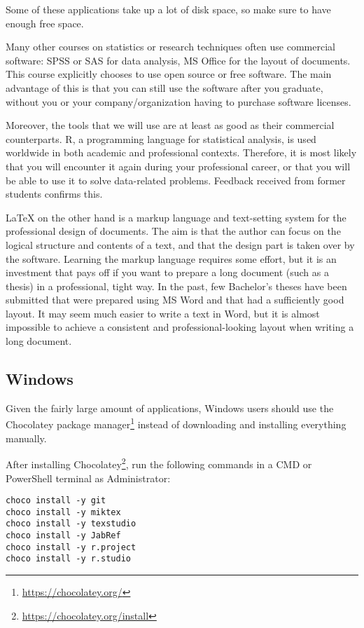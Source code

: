 Some of these applications take up a lot of disk space, so make sure to have enough free space.

Many other courses on statistics or research techniques often use commercial software: SPSS or SAS for data analysis, MS Office for the layout of documents. This course explicitly chooses to use open source or free software. The main advantage of this is that you can still use the software after you graduate, without you or your company/organization having to purchase software licenses.

Moreover, the tools that we will use are at least as good as their commercial counterparts. R, a programming language for statistical analysis, is used worldwide in both academic and professional contexts. Therefore, it is most likely that you will encounter it again during your professional career, or that you will be able to use it to solve data-related problems. Feedback received from former students confirms this.

\LaTeX{} on the other hand is a markup language and text-setting system for the professional design of documents. The aim is that the author can focus on the logical structure and contents of a text, and that the design part is taken over by the software. Learning the markup language requires some effort, but it is an investment that pays off if you want to prepare a long document (such as a thesis) in a professional, tight way. In the past, few Bachelor's theses have been submitted that were prepared using MS Word and that had a sufficiently good layout. It may seem much easier to write a text in Word, but it is almost impossible to achieve a consistent and professional-looking layout when writing a long document.

\subsection{Windows}

Given the fairly large amount of applications, Windows users should use the Chocolatey package manager\footnote{\url{https://chocolatey.org/}} instead of downloading and installing everything manually.

After installing Chocolatey\footnote{\url{https://chocolatey.org/install}}, run the following commands in a CMD or PowerShell terminal as Administrator:

\begin{verbatim}
choco install -y git
choco install -y miktex
choco install -y texstudio
choco install -y JabRef
choco install -y r.project
choco install -y r.studio
\end{verbatim}


